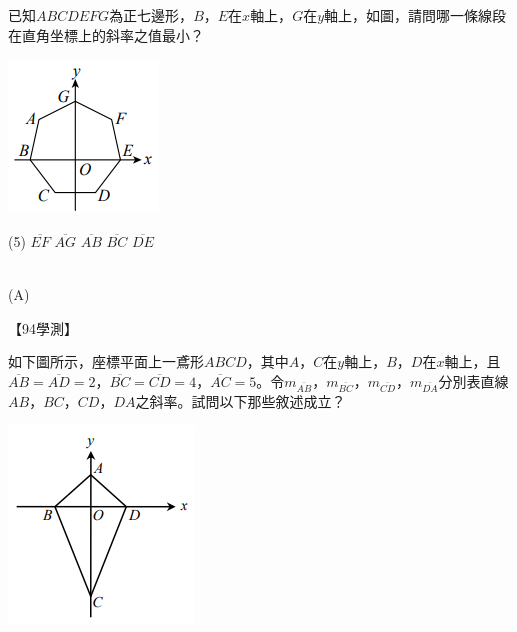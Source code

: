 \documentclass
[answers]
{exam}
\theoremstyle{definition}
\begin{document}
\begin{questions}
\begin{minipage}[t]{0.7\linewidth}
	已知$ABCDEFG$為正七邊形，$B$，$E$在$x$軸上，$G$在$y$軸上，如圖，請問哪一條線段在直角坐標上的斜率之值最小？
\end{minipage}
\hfill
\begin{minipage}[t]{0.3\linewidth}
	\vspace*{-0.3cm}
	\includegraphics[scale=1]{./figure/1.png}
	\raggedleft %
\end{minipage}

\begin{tasks}(5)
	\task $\overline{EF}$
	\task $\overline{AG}$
	\task $\overline{AB}$
	\task $\overline{BC}$
	\task $\overline{DE}$
\end{tasks}

\begin{solution}~\\
	(A)
\end{solution}





\question
【94學測】\\
\begin{minipage}[t]{0.7\linewidth}
	如下圖所示，座標平面上一鳶形$ABCD$，其中$A$，$C$在$y$軸上，$B$，$D$在$x$軸上，且$\overline{AB} = \overline{AD} = 2$，$\overline{BC} = \overline{CD} = 4$，$\overline{AC}=5$。令$m_{\overline{AB}}$，$m_{\overline{BC}}$，$m_{\overline{CD}}$，$m_{\overline{DA}}$分別表直線$AB$，$BC$，$CD$，$DA$之斜率。試問以下那些敘述成立？
\end{minipage}
\hfill
\begin{minipage}[t]{0.3\linewidth}
	\vspace*{-0.3cm}
	\includegraphics[scale=1]{./figure/2.png}
	\raggedleft %
\end{minipage}





\end{questions}
\end{document}

